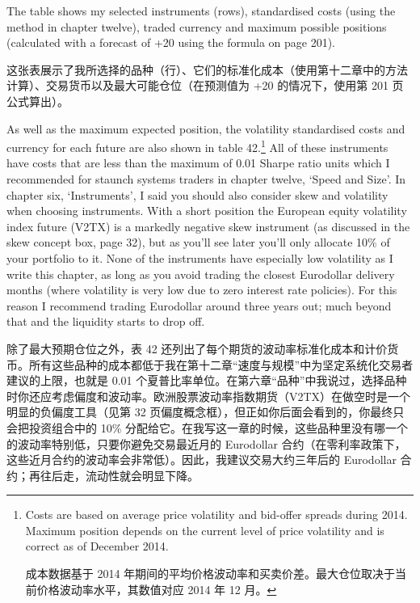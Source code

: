 \begin{englishblock} The table shows my selected instruments (rows), standardised costs (using the method in chapter twelve), traded currency and maximum possible positions (calculated with a forecast of +20 using the formula on page 201). \end{englishblock}

\begin{chineseblock}这张表展示了我所选择的品种（行）、它们的标准化成本（使用第十二章中的方法计算）、交易货币以及最大可能仓位（在预测值为 +20 的情况下，使用第 201 页公式算出）。\end{chineseblock}

\bipairgap

\begin{englishblock} As well as the maximum expected position, the volatility standardised costs and currency for each future are also shown in table 42.\footnote{Costs are based on average price volatility and bid-offer spreads during 2014. Maximum position depends on the current level of price volatility and is correct as of December 2014. \par 成本数据基于 2014 年期间的平均价格波动率和买卖价差。最大仓位取决于当前价格波动率水平，其数值对应 2014 年 12 月。} All of these instruments have costs that are less than the maximum of 0.01 Sharpe ratio units which I recommended for staunch systems traders in chapter twelve, ‘Speed and Size'. In chapter six, ‘Instruments', I said you should also consider skew and volatility when choosing instruments. With a short position the European equity volatility index future (V2TX) is a markedly negative skew instrument (as discussed in the skew concept box, page 32), but as you'll see later you'll only allocate 10\% of your portfolio to it. None of the instruments have especially low volatility as I write this chapter, as long as you avoid trading the closest Eurodollar delivery months (where volatility is very low due to zero interest rate policies). For this reason I recommend trading Eurodollar around three years out; much beyond that and the liquidity starts to drop off. \end{englishblock}

\begin{chineseblock}除了最大预期仓位之外，表 42 还列出了每个期货的波动率标准化成本和计价货币。所有这些品种的成本都低于我在第十二章“速度与规模”中为坚定系统化交易者建议的上限，也就是 0.01 个夏普比率单位。在第六章“品种”中我说过，选择品种时你还应考虑偏度和波动率。欧洲股票波动率指数期货（V2TX）在做空时是一个明显的负偏度工具（见第 32 页偏度概念框），但正如你后面会看到的，你最终只会把投资组合中的 10\% 分配给它。在我写这一章的时候，这些品种里没有哪一个的波动率特别低，只要你避免交易最近月的 Eurodollar 合约（在零利率政策下，这些近月合约的波动率会非常低）。因此，我建议交易大约三年后的 Eurodollar 合约；再往后走，流动性就会明显下降。\end{chineseblock}

